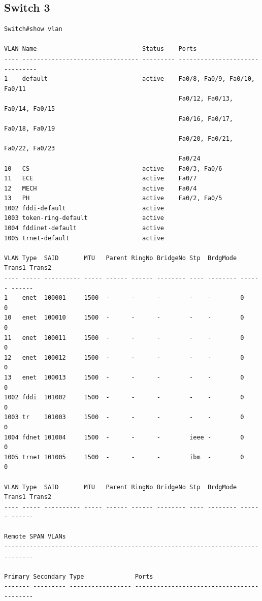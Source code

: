 \documentclass[11pt]{article}
\begin{document}
\subsection{Switch 3}
\begin{lstlisting}
Switch#show vlan
	
VLAN Name                             Status    Ports
---- -------------------------------- --------- -------------------------------
1    default                          active    Fa0/8, Fa0/9, Fa0/10, Fa0/11
                                                Fa0/12, Fa0/13, Fa0/14, Fa0/15
                                                Fa0/16, Fa0/17, Fa0/18, Fa0/19
                                                Fa0/20, Fa0/21, Fa0/22, Fa0/23
                                                Fa0/24
10   CS                               active    Fa0/3, Fa0/6
11   ECE                              active    Fa0/7
12   MECH                             active    Fa0/4
13   PH                               active    Fa0/2, Fa0/5
1002 fddi-default                     active    
1003 token-ring-default               active    
1004 fddinet-default                  active    
1005 trnet-default                    active    

VLAN Type  SAID       MTU   Parent RingNo BridgeNo Stp  BrdgMode Trans1 Trans2
---- ----- ---------- ----- ------ ------ -------- ---- -------- ------ ------
1    enet  100001     1500  -      -      -        -    -        0      0
10   enet  100010     1500  -      -      -        -    -        0      0
11   enet  100011     1500  -      -      -        -    -        0      0
12   enet  100012     1500  -      -      -        -    -        0      0
13   enet  100013     1500  -      -      -        -    -        0      0
1002 fddi  101002     1500  -      -      -        -    -        0      0   
1003 tr    101003     1500  -      -      -        -    -        0      0   
1004 fdnet 101004     1500  -      -      -        ieee -        0      0   
1005 trnet 101005     1500  -      -      -        ibm  -        0      0   

VLAN Type  SAID       MTU   Parent RingNo BridgeNo Stp  BrdgMode Trans1 Trans2
---- ----- ---------- ----- ------ ------ -------- ---- -------- ------ ------

Remote SPAN VLANs
------------------------------------------------------------------------------

Primary Secondary Type              Ports
------- --------- ----------------- ------------------------------------------
\end{lstlisting}
\end{document}
